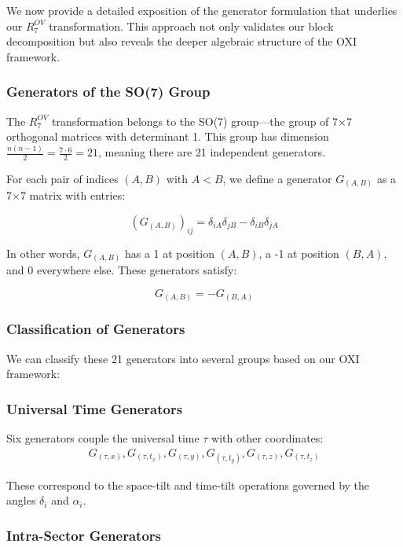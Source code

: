\documentclass{article}
\begin{document}
We now provide a detailed exposition of the generator formulation that underlies our $R^{OV}_7$ transformation. This approach not only validates our block decomposition but also reveals the deeper algebraic structure of the OXI framework.

\subsubsection{Generators of the SO(7) Group}

The $R^{OV}_7$ transformation belongs to the SO(7) group—the group of 7×7 orthogonal matrices with determinant 1. This group has dimension $\frac{n(n-1)}{2} = \frac{7 \cdot 6}{2} = 21$, meaning there are 21 independent generators.

For each pair of indices $(A,B)$ with $A < B$, we define a generator $G_{(A,B)}$ as a 7×7 matrix with entries:

\begin{equation}
(G_{(A,B)})_{ij} = \delta_{iA}\delta_{jB} - \delta_{iB}\delta_{jA}
\end{equation}

In other words, $G_{(A,B)}$ has a 1 at position $(A,B)$, a -1 at position $(B,A)$, and 0 everywhere else. These generators satisfy:

\begin{equation}
G_{(A,B)} = -G_{(B,A)}
\end{equation}

\subsubsection{Classification of Generators}

We can classify these 21 generators into several groups based on our OXI framework:

\subsubsection*{Universal Time Generators}

Six generators couple the universal time $\tau$ with other coordinates:
\begin{align}
G_{(\tau,x)}, G_{(\tau,t_x)}, G_{(\tau,y)}, G_{(\tau,t_y)}, G_{(\tau,z)}, G_{(\tau,t_z)}
\end{align}

These correspond to the space-tilt and time-tilt operations governed by the angles $\delta_i$ and $\alpha_i$.

\subsubsection*{Intra-Sector Generators}
\end{document}
